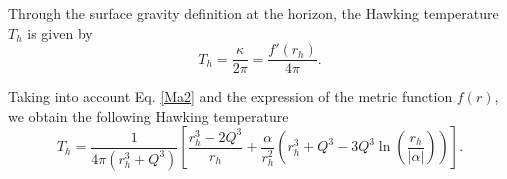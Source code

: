 \documentclass[10pt,letterpaper]{article}
\begin{document}



Through the surface gravity definition at the horizon\cite{nam2018on}, the Hawking temperature $T_h$ is given by
\begin{equation}
T_h= \frac{\kappa}{2\pi}=\frac{f'(r_h)}{4\pi}.
\end{equation}

Taking into account Eq. \eqref{Ma2} and the expression of the metric function $f(r)$, we obtain the following Hawking temperature
\begin{equation}\label{Temp_nonlin2}
T_h=\frac{1}{4\pi (r_h^3+Q^3)}\left[\frac{r_h^3-2Q^3}{r_h}+\frac{\alpha}{r_h^2}\left( r_h^3+Q^3-3Q^3\ln\left(\frac{r_h}{|\alpha|}\right) \right)  \right].
\end{equation}
\end{document}
